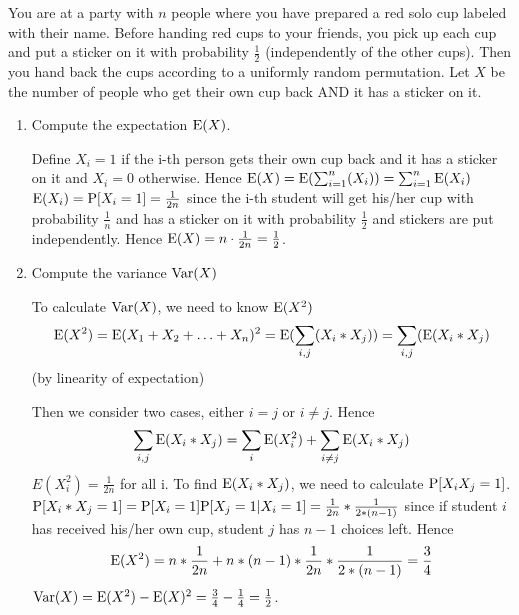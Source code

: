 \question You are at a party with $n$ people where you have prepared a 
red solo cup labeled with their name. Before handing red cups to your 
friends, you pick up each cup and put a sticker on it with probability 
$\frac{1}{2}$ (independently of the other cups). Then you hand back the 
cups according to a uniformly random permutation. Let $X$ be the number 
of people who get their own cup back AND it has a sticker on it.
\begin{enumerate}[label=(\alph*)]
\item Compute the expectation $\E(X)$.
        \begin{solution}[3cm]
Define $X_i = 1$ if the i-th person gets their own cup back and it 
has a sticker on it and $X_i = 0$ otherwise. Hence $\E(X) = \E(\sum_{i=1}^{n}(X_i)) = \sum_{i=1}^{n} \E(X_i) $
$\E(X_i) = \P[X_i = 1] = \frac{1}{2n}$ since the i-th student will get 
his/her cup with probability $\frac{1}{n}$ and has a sticker on it with 
probability $\frac{1}{2}$ and stickers are put independently. 
Hence $\E(X) = n \cdot \frac{1}{2n} = \frac{1}{2}$.
\end{solution}

\item Compute the variance $\var(X)$
    \begin{solution}[3cm]
To calculate $\var(X)$, we need to know $\E(X^2)$
\begin{equation*}
\E(X^2) = \E (X_1 + X_2 + \dotsc + X_n)^2  = \E(\sum_{i, j}(X_i * X_j) ) = 
\sum_{i,j} (\E(X_i * X_j )
\end{equation*} (by linearity of expectation) 

Then we consider two cases, either $i = j$ or $i \neq j.$ 
Hence 
\begin{equation*}
\sum_{i,j} \E(X_i * X_j) = \sum_{i} \E(X_i^2) + \sum_ {i \neq j} \E(X_i * X_j ) 
\end{equation*}
$E(X_i^2) = \frac{1}{2n}$ for all i. 
To find $\E(X_i * X_j  )$, we need to calculate $\P[X_iX_j = 1]$. 
$\P[X_i * X_j  = 1] = \P[X_i = 1] \P[X_j = 1 | X_i = 1] = \frac{1}{2n} * \frac{1}{2 * (n-1)}$ since if student $i$ has received his/her own cup, student $j$ has $n - 1$ choices left. 
Hence 
\begin{equation*}
\E(X^2 ) = n * \frac{1}{2n} + n * (n - 1) * \frac{1}{2n} * \frac{1}{2 * (n-1)}= 
\frac{3}{4}
\end{equation*}
$\var(X) = \E(X^2 ) - \E(X)^2 = \frac{3}{4} - \frac{1}{4} = \frac{1}{2} $.
\end{solution}
\end{enumerate}